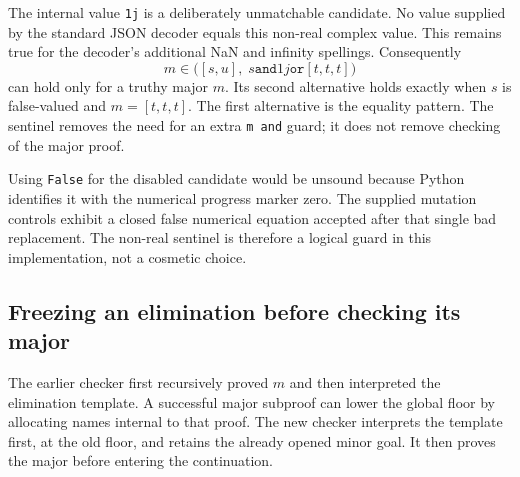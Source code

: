 The internal value \texttt{1j} is a deliberately unmatchable candidate.
No value supplied by the standard JSON decoder equals this non-real
complex value. This remains true for the decoder's additional NaN and
infinity spellings. Consequently
\[
 m\in\bigl([s,u],\;s\mathbin{\texttt{and}}1j
                       \mathbin{\texttt{or}}[t,t,t]\bigr)
\]
can hold only for a truthy major $m$. Its second alternative holds
exactly when $s$ is false-valued and $m=[t,t,t]$. The first alternative
is the equality pattern. The sentinel removes the need for an extra
\texttt{m and} guard; it does not remove checking of the major proof.

Using \texttt{False} for the disabled candidate would be unsound because
Python identifies it with the numerical progress marker zero. The
supplied mutation controls exhibit a closed false numerical equation
accepted after that single bad replacement. The non-real sentinel is
therefore a logical guard in this implementation, not a cosmetic choice.

\subsection{Freezing an elimination before checking its major}

The earlier checker first recursively proved $m$ and then interpreted
the elimination template. A successful major subproof can lower the
global floor by allocating names internal to that proof. The new
checker interprets the template first, at the old floor, and retains
the already opened minor goal. It then proves the major before entering
the continuation.

